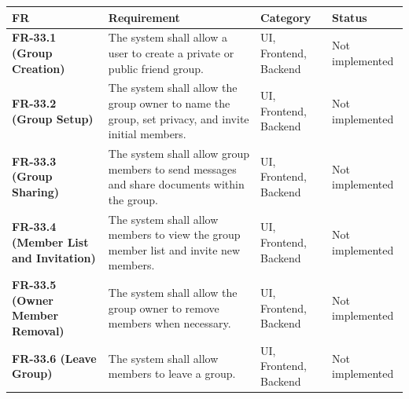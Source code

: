 \documentclass[12pt]{article}
\renewcommand{\baselinestretch}{1.5}
\begin{document}
\begingroup
\small
\renewcommand{\baselinestretch}{1.0}\selectfont
\renewcommand{\arraystretch}{1.15}
\setlength{\tabcolsep}{6pt}
\begin{longtable}{|>{\raggedright\arraybackslash}p{}|>{\raggedright\arraybackslash}p{}|>{\raggedright\arraybackslash}p{}|>{\raggedright\arraybackslash}p{}|}
\hline
\textbf{FR} & \textbf{Requirement} & \textbf{Category} & \textbf{Status} \\ \hline
\endhead
\textbf{FR-33.1 (Group Creation)} & The system shall allow a user to create a private or public friend group. & UI, Frontend, Backend & Not implemented \\ \hline
\textbf{FR-33.2 (Group Setup)} & The system shall allow the group owner to name the group, set privacy, and invite initial members. & UI, Frontend, Backend & Not implemented \\ \hline
\textbf{FR-33.3 (Group Sharing)} & The system shall allow group members to send messages and share documents within the group. & UI, Frontend, Backend & Not implemented \\ \hline
\textbf{FR-33.4 (Member List and Invitation)} & The system shall allow members to view the group member list and invite new members. & UI, Frontend, Backend & Not implemented \\ \hline
\textbf{FR-33.5 (Owner Member Removal)} & The system shall allow the group owner to remove members when necessary. & UI, Frontend, Backend & Not implemented \\ \hline
\textbf{FR-33.6 (Leave Group)} & The system shall allow members to leave a group. & UI, Frontend, Backend & Not implemented \\ \hline
\end{longtable}
\endgroup
\par\medskip

\par\medskip
\hypertarget{sec:ui-prototype-specimens}{}
\end{document}
